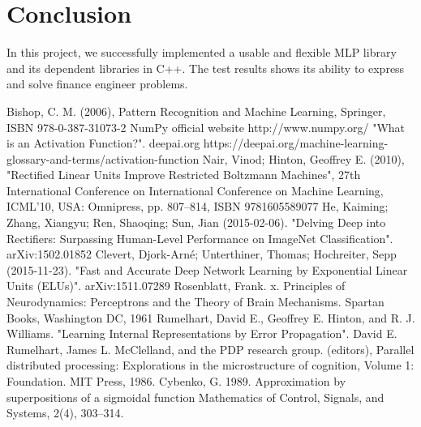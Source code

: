 \documentclass[letterpaper]{article}
\begin{document}
\section{Conclusion}
In this project, we successfully implemented a usable and flexible MLP library and its dependent libraries in C++. The test results shows its ability to express and solve finance engineer problems. 








\newpage
\begin{thebibliography}{9}
 Bishop, C. M. (2006), Pattern Recognition and Machine Learning, Springer, ISBN 978-0-387-31073-2
 NumPy official website http://www.numpy.org/
 "What is an Activation Function?". deepai.org https://deepai.org/machine-learning-glossary-and-terms/activation-function
 Nair, Vinod; Hinton, Geoffrey E. (2010), "Rectified Linear Units Improve Restricted Boltzmann Machines", 27th International Conference on International Conference on Machine Learning, ICML'10, USA: Omnipress, pp. 807–814, ISBN 9781605589077
  He, Kaiming; Zhang, Xiangyu; Ren, Shaoqing; Sun, Jian (2015-02-06). "Delving Deep into Rectifiers: Surpassing Human-Level Performance on ImageNet Classification". arXiv:1502.01852 
 Clevert, Djork-Arné; Unterthiner, Thomas; Hochreiter, Sepp (2015-11-23). "Fast and Accurate Deep Network Learning by Exponential Linear Units (ELUs)". arXiv:1511.07289
 Rosenblatt, Frank. x. Principles of Neurodynamics: Perceptrons and the Theory of Brain Mechanisms. Spartan Books, Washington DC, 1961
 Rumelhart, David E., Geoffrey E. Hinton, and R. J. Williams. "Learning Internal Representations by Error Propagation". David E. Rumelhart, James L. McClelland, and the PDP research group. (editors), Parallel distributed processing: Explorations in the microstructure of cognition, Volume 1: Foundation. MIT Press, 1986.
 Cybenko, G. 1989. Approximation by superpositions of a sigmoidal function Mathematics of Control, Signals, and Systems, 2(4), 303–314.
\end{thebibliography}
\end{document}
